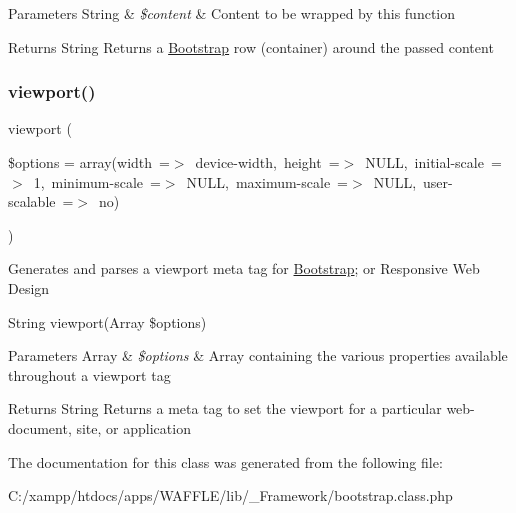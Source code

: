 \begin{DoxyParams}[1]{Parameters}
String & {\em \$content} & Content to be wrapped by this function \\
\hline
\end{DoxyParams}
\begin{DoxyReturn}{Returns}
String Returns a \hyperlink{class_w_a_f_f_l_e_1_1_framework_1_1_engines_1_1_bootstrap}{Bootstrap} row (container) around the passed content 
\end{DoxyReturn}
\mbox{\label{class_w_a_f_f_l_e_1_1_framework_1_1_engines_1_1_bootstrap_a760d6816b7e769fe6915845ea3d77cdd}} 
\subsubsection{\texorpdfstring{viewport()}{viewport()}}
{\footnotesize\ttfamily viewport (\begin{DoxyParamCaption}\item[{}]{\$options = {\ttfamily array(\textquotesingle{}width\textquotesingle{}~=$>$~\textquotesingle{}device-\/width\textquotesingle{},~\textquotesingle{}height\textquotesingle{}~=$>$~NULL,~\textquotesingle{}initial-\/scale\textquotesingle{}~=$>$~1,~\textquotesingle{}minimum-\/scale\textquotesingle{}~=$>$~NULL,~\textquotesingle{}maximum-\/scale\textquotesingle{}~=$>$~NULL,~\textquotesingle{}user-\/scalable\textquotesingle{}~=$>$~\textquotesingle{}no\textquotesingle{})} }\end{DoxyParamCaption})}

Generates and parses a viewport meta tag for \hyperlink{class_w_a_f_f_l_e_1_1_framework_1_1_engines_1_1_bootstrap}{Bootstrap}; or Responsive Web Design

String viewport(Array \$options)


\begin{DoxyParams}[1]{Parameters}
Array & {\em \$options} & Array containing the various properties available throughout a viewport tag \\
\hline
\end{DoxyParams}
\begin{DoxyReturn}{Returns}
String Returns a meta tag to set the viewport for a particular web-\/document, site, or application 
\end{DoxyReturn}


The documentation for this class was generated from the following file\+:\begin{DoxyCompactItemize}
\item 
C\+:/xampp/htdocs/apps/\+W\+A\+F\+F\+L\+E/lib/\+\_\+\+Framework/bootstrap.\+class.\+php\end{DoxyCompactItemize}
